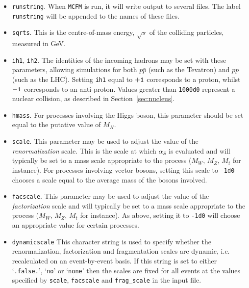 \documentclass[12pt]{article}
\begin{document}
\begin{itemize}
\item {\tt runstring}.
When {\tt MCFM} is run, it will write output to several files. The
label {\tt runstring} will be appended to the names of these files.

\item {\tt sqrts}. This is the centre-of-mass energy, $\sqrt{s}$ of
the colliding particles, measured in GeV.

\item {\tt ih1}, {\tt ih2}. The identities of the incoming hadrons
may be set with these parameters, allowing simulations for both
$p{\bar p}$ (such as the Tevatron) and $pp$ (such as the LHC). 
Setting {\tt ih1} equal to ${\tt +1}$ corresponds to
a proton, whilst ${\tt -1}$ corresponds to an anti-proton.
Values greater than {\tt 1000d0} represent a nuclear collision,
as described in Section~\ref{sec:nucleus}.

\item {\tt hmass}. For processes involving the Higgs boson, this
parameter should be set equal to the putative value of $M_H$.

\item {\tt scale}. This parameter may be used to adjust the value
of the {\it renormalization} scale. This is the scale
at which $\alpha_S$ is evaluated and will typically be set to
a mass scale appropriate to the process ($M_W$, $M_Z$, $M_t$ for
instance). For processes involving vector bosons, setting this
scale to {\tt -1d0} chooses a scale equal to the average mass of
the bosons involved.

\item {\tt facscale}. This parameter may be used to adjust the value
of the {\it factorization} scale and will typically be set to
a mass scale appropriate to the process ($M_W$, $M_Z$, $M_t$ for
instance). As above, setting it to {\tt -1d0} will choose an
appropriate value for certain processes.

\item {\tt dynamicscale} This character string is used to specify whether
the renormalization, factorization and fragmentation scales are dynamic, i.e. recalculated
on an event-by-event basis. If this string is set to either `{\tt .false.}',
`{\tt no}' or `{\tt none}' then the scales are fixed for all events at the values
specified by {\tt scale}, {\tt facscale} and {\tt frag\_scale} in the input file.


\end{itemize}
\end{document}
